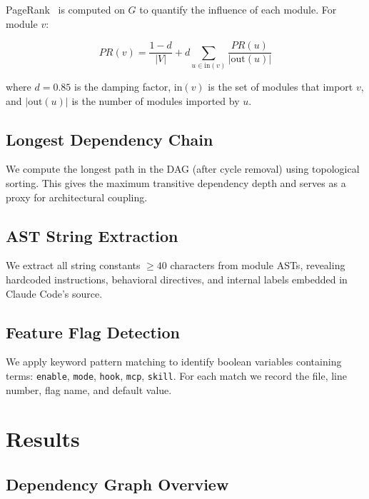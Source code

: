 \documentclass[conference]{IEEEtran}
\begin{document}
PageRank~\cite{page1999pagerank} is computed on $G$ to quantify the
influence of each module. For module $v$:

\begin{equation}
  PR(v) = \frac{1-d}{|V|} + d \sum_{u \in \mathrm{in}(v)}
  \frac{PR(u)}{|\mathrm{out}(u)|}
  \label{eq:pagerank}
\end{equation}

where $d = 0.85$ is the damping factor, $\mathrm{in}(v)$ is the set
of modules that import $v$, and $|\mathrm{out}(u)|$ is the number of
modules imported by $u$.

\subsection{Longest Dependency Chain}

We compute the longest path in the DAG (after cycle removal) using
topological sorting. This gives the maximum transitive dependency depth
and serves as a proxy for architectural coupling.

\subsection{AST String Extraction}

We extract all string constants $\geq 40$ characters from module ASTs,
revealing hardcoded instructions, behavioral directives, and internal
labels embedded in Claude Code's source.

\subsection{Feature Flag Detection}

We apply keyword pattern matching to identify boolean variables
containing terms: \texttt{enable}, \texttt{mode}, \texttt{hook},
\texttt{mcp}, \texttt{skill}. For each match we record the file,
line number, flag name, and default value.

\section{Results}

\subsection{Dependency Graph Overview}
\end{document}
